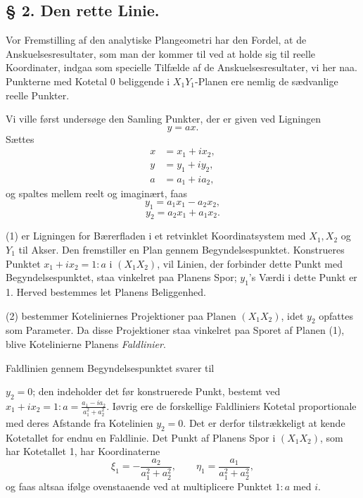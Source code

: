 \documentclass{article}
\begin{document}
\subsection*{§ 2. Den rette Linie.}

Vor Fremstilling af den analytiske Plangeometri har den Fordel, at de Anskuelsesresultater, som man der kommer til ved at holde sig til reelle Koordinater, indgaa som specielle Tilfælde af de Anskuelsesresultater, vi her naa. Punkterne med Kotetal 0 beliggende i $X_1 Y_1$-Planen ere nemlig de sædvanlige reelle Punkter.

Vi ville først undersøge den Samling Punkter, der er given ved Ligningen
\[
y = ax.
\]
Sættes
\[
\begin{aligned}
x &= x_1 + i x_2, \\
y &= y_1 + i y_2, \\
a &= a_1 + i a_2,
\end{aligned}
\]
og spaltes mellem reelt og imaginært, faas
\[
y_1 = a_1 x_1 - a_2 x_2, \tag{1}
\]
\[
y_2 = a_2 x_1 + a_1 x_2. \tag{2}
\]

(1) er Ligningen for Bærerfladen i et retvinklet Koordinatsystem med $X_1, X_2$ og $Y_1$ til Akser. Den fremstiller en Plan gennem Begyndelsespunktet. Konstrueres Punktet $x_1 + i x_2 = 1 : a$ i $(X_1 X_2)$, vil Linien, der forbinder dette Punkt med Begyndelsespunktet, staa vinkelret paa Planens Spor; $y_1$'s Værdi i dette Punkt er 1. Herved bestemmes let Planens Beliggenhed.

(2) bestemmer Koteliniernes Projektioner paa Planen $(X_1 X_2)$, idet $y_2$ opfattes som Parameter. Da disse Projektioner staa vinkelret paa Sporet af Planen (1), blive Kotelinierne Planens \emph{Faldlinier}.

Faldlinien gennem Begyndelsespunktet svarer til

$y_2 = 0$; den indeholder det før konstruerede Punkt, bestemt ved $x_1 + i x_2 = 1 : a = \frac{a_1 - i a_2}{a_1^2 + a_2^2}$. Iøvrig ere de forskellige Faldliniers Kotetal proportionale med deres Afstande fra Kotelinien $y_2 = 0$. Det er derfor tilstrækkeligt at kende Kotetallet for endnu en Faldlinie. Det Punkt af Planens Spor i $(X_1 X_2)$, som har Kotetallet 1, har Koordinaterne
\[
\xi_1 = -\frac{a_2}{a_1^2 + a_2^2}, \qquad \eta_1 = \frac{a_1}{a_1^2 + a_2^2},
\]
og faas altsaa ifølge ovenstaaende ved at multiplicere Punktet $1 : a$ med $i$.
\end{document}
